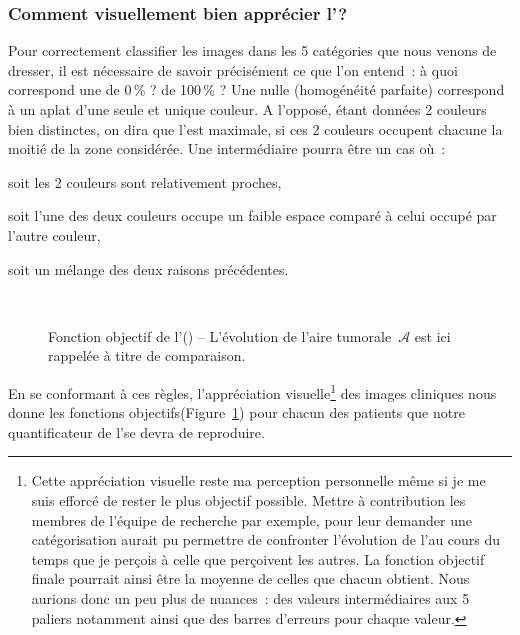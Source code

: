 \documentclass[main.tex]{subfiles}
\begin{document}
\subsubsection*{Comment visuellement bien apprécier l'\hetero ?}
Pour correctement classifier les images dans les 5 catégories que nous venons de dresser, il est nécessaire de savoir précisément ce que l'on entend~: à quoi correspond une \hetero de 0\,\% ? de 100\,\% ? Une \hetero nulle (\ie homogénéité parfaite) correspond à un aplat d'une seule et unique couleur. A l'opposé, étant données 2 couleurs bien distinctes, on dira que l'\hetero est maximale, si  ces 2 couleurs occupent chacune la moitié de la zone considérée. Une \hetero intermédiaire pourra être un cas où~:
\begin{myitemize}
\item soit les 2 couleurs sont relativement proches,
\item soit l'une des deux couleurs occupe un faible espace comparé à celui occupé par l'autre couleur, 
\item soit un mélange des deux raisons précédentes.
\end{myitemize}~
\begin{figure}
\caption{\label{fig:hetero_visuelle}Fonction objectif de l'\hetero (\!\!\HHobj) -- L'évolution de l'aire tumorale~$\mathcal{A}$ est ici rappelée à titre de comparaison.}
\end{figure}


En se conformant à ces règles, l'appréciation visuelle\footnote{\samepage Cette appréciation visuelle reste ma perception personnelle même si je me suis efforcé de rester le plus objectif possible. Mettre à contribution les membres de l'équipe de recherche par exemple, pour leur demander une catégorisation aurait pu permettre de confronter l'évolution de l'\hetero au cours du temps que je perçois à celle que perçoivent les autres. La fonction objectif finale pourrait ainsi être la moyenne de celles que chacun obtient. Nous aurions donc un peu plus de nuances~: des valeurs intermédiaires aux 5 paliers notamment ainsi que des barres d'erreurs pour chaque valeur.}
 des images cliniques nous donne les fonctions objectifs\HHobj (\cf Figure~\ref{fig:hetero_visuelle}) pour chacun des patients que notre quantificateur de l'\hetero se devra de reproduire. 
 
\end{document}
